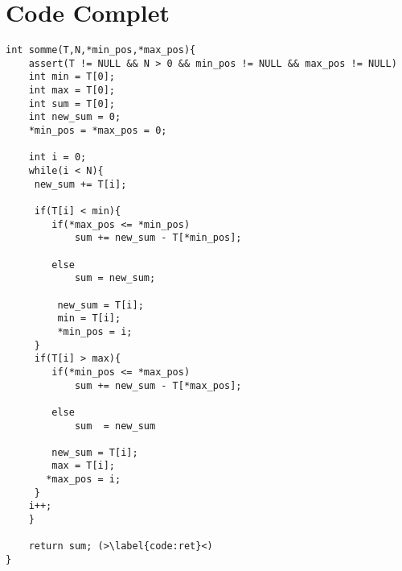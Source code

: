 \section{Code Complet}\label{code}
\begin{lstlisting}[caption={somme.c}]
int somme(T,N,*min_pos,*max_pos){
    assert(T != NULL && N > 0 && min_pos != NULL && max_pos != NULL)
    int min = T[0];
    int max = T[0];
    int sum = T[0];
    int new_sum = 0;
    *min_pos = *max_pos = 0;

    int i = 0;
    while(i < N){
     new_sum += T[i];

     if(T[i] < min){
        if(*max_pos <= *min_pos)
            sum += new_sum - T[*min_pos];

        else
            sum = new_sum;

         new_sum = T[i];
         min = T[i];
         *min_pos = i;
     }
     if(T[i] > max){
        if(*min_pos <= *max_pos)
            sum += new_sum - T[*max_pos];

        else
            sum  = new_sum

        new_sum = T[i];
        max = T[i];
       *max_pos = i;
     }
    i++;
    }
    
    return sum; (>\label{code:ret}<)
}
\end{lstlisting}